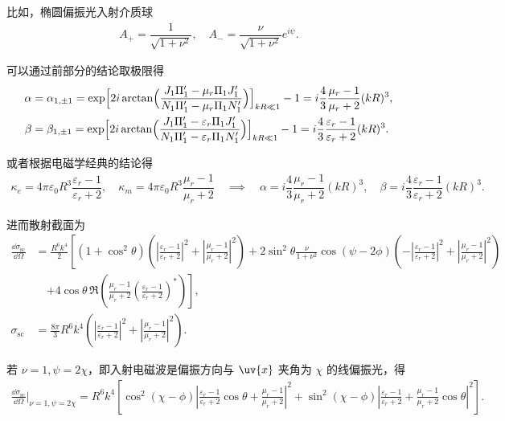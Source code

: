 \begin{exbox}
	比如，椭圆偏振光入射介质球
	\begin{align*}
		A_+ = \dfrac{1}{\sqrt{1+\nu^2}}, \quad A_- = \dfrac{\nu}{\sqrt{1+\nu^2}}e^{i\psi}.
	\end{align*}

	可以通过前部分的结论取极限得
	\begin{align*}
		\alpha &= \alpha_{1,\pm1} = \exp\Bigl[2i\arctan\Bigl(\dfrac{J_1\Pi_1'- \mu_r \Pi_1 J_1'}{N_1\Pi_1'- \mu_r \Pi_1 N_1'}\Bigr)\Bigr]_{kR\ll1}-1 = i\dfrac{4}{3}\dfrac{\mu_r-1}{\mu_r+2}(kR)^3,\\
		\beta &= \beta_{1,\pm1} = \exp\Bigl[2i\arctan\Bigl(\dfrac{J_1\Pi_1'- \varepsilon_r \Pi_1 J_1'}{N_1\Pi_1'- \varepsilon_r \Pi_1 N_1'}\Bigr)\Bigr]_{kR\ll1}-1 = i\dfrac{4}{3}\dfrac{\varepsilon_r-1}{\varepsilon_r+2}(kR)^3.
	\end{align*}

	或者根据电磁学经典的结论得
	\begin{align*}
		\kappa_e = 4\pi \varepsilon_0 R^3 \dfrac{\varepsilon_r-1}{\varepsilon_r+2}, \quad \kappa_m = 4\pi \varepsilon_0 R^3 \dfrac{\mu_r-1}{\mu_r+2} \quad\implies\quad
		\alpha = i\dfrac{4}{3}\dfrac{\mu_r-1}{\mu_r+2}(kR)^3, \quad \beta = i\dfrac{4}{3}\dfrac{\varepsilon_r-1}{\varepsilon_r+2}(kR)^3.
	\end{align*}

	进而散射截面为
	\begin{align*}
		\frac{\dd \sigma_{\text{sc}}}{\dd \Omega} & = \frac{R^6k^4}{2}\left[(1+\cos^2\theta)\left(\left|\frac{\varepsilon_r-1}{\varepsilon_r+2}\right|^2+\left|\frac{\mu_r-1}{\mu_r+2}\right|^2\right)+2\sin^2\theta\frac{\nu}{1+\nu^2}\cos(\psi-2\phi)\left(-\left|\frac{\varepsilon_r-1}{\varepsilon_r+2}\right|^2+\left|\frac{\mu_r-1}{\mu_r+2}\right|^2\right)\right. \\
		                                        & \quad\left.+4\cos\theta\,\Re\left(\frac{\mu_r-1}{\mu_r+2}\left(\frac{\varepsilon_r-1}{\varepsilon_r+2}\right)^*\right)\right],                                                                                                                                                                                        \\
		\sigma_{\text{sc}}                      & = \frac{8\pi}{3}R^6k^4\left(\left|\frac{\varepsilon_r-1}{\varepsilon_r+2}\right|^2+\left|\frac{\mu_r-1}{\mu_r+2}\right|^2\right).
	\end{align*}

	若 \(\nu=1,\psi=2\chi\)，即入射电磁波是偏振方向与 \(\uv{x}\) 夹角为 \(\chi\) 的线偏振光，得
	\begin{align*}
		\frac{\dd \sigma_{\text{sc}}}{\dd \Omega}\bigg|_{\nu=1,\psi=2\chi}=R^6k^4\left[\cos^2(\chi-\phi)\left|\frac{\varepsilon_r-1}{\varepsilon_r+2}\cos\theta+\frac{\mu_r-1}{\mu_r+2}\right|^2+\sin^2(\chi-\phi)\left|\frac{\varepsilon_r-1}{\varepsilon_r+2}+\frac{\mu_r-1}{\mu_r+2}\cos\theta\right|^2\right].
	\end{align*}


\end{exbox}
